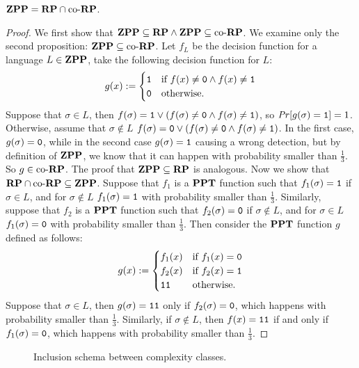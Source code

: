 \begin{theorem}
  \label{thm:zpprpcorp1}
  $\mathbf{ZPP} = \mathbf{RP} \cap \text{co-}\mathbf{RP}$.
\end{theorem}
\begin{proof}
  We first show that $\mathbf{ZPP} \subseteq \mathbf{RP} \land \mathbf{ZPP} \subseteq \text{co-}\mathbf{RP}$.
  We examine only the second proposition: $\mathbf{ZPP} \subseteq \text{co-}\mathbf{RP}$.
  Let $f_L$ be the decision function for a language $L \in \mathbf{ZPP}$,
  take the following decision function for $L$:
  $$
  g(x) := \begin{cases} \mathtt{1} & \text{if } f(x)\neq \mathtt{0} \land f(x)\neq \mathtt{1} \\ \mathtt{0} & \text{otherwise.}\end{cases}
  $$
  Suppose that $\sigma \in L$, then $f(\sigma)=\mathtt{1} \lor (f(\sigma)\neq \mathtt{0} \land f(\sigma)\neq \mathtt{1})$,
  so $\mathit{Pr}[g(\sigma)=\mathtt{1}]=1$. Otherwise, assume that $\sigma \not \in L$
  $f(\sigma)=\mathtt{0} \lor (f(\sigma)\neq \mathtt{0} \land f(\sigma)\neq \mathtt{1})$. In the first case,
  $g(\sigma)=\mathtt{0}$, while in the second case $g(\sigma)=\mathtt{1}$ causing a wrong detection,
  but by definition of $\mathbf{ZPP}$, we know that it can happen with probability smaller than
  $\frac 1 3$. So $g \in \text{co-}\mathbf{RP}$. The proof that $\mathbf{ZPP} \subseteq \mathbf{RP}$ is analogous.
  Now we show that $\mathbf{RP} \cap \text{co-}\mathbf{RP} \subseteq \mathbf{ZPP}$.
  Suppose that $f_1$ is a $\mathbf{PPT}$ function such that $f_1(\sigma)=\mathtt{1}$ if $\sigma \in L$,
  and for $\sigma \not \in L$ $f_1(\sigma)=\mathtt{1}$ with probability smaller than $\frac 1 3$.
  Similarly, suppose that $f_2$ is a $\mathbf{PPT}$ function such that $f_2(\sigma)=\mathtt{0}$ if $\sigma \not \in L$,
  and for $\sigma \in L$ $f_1(\sigma)=\mathtt{0}$ with probability smaller than $\frac 1 3$.
  Then consider the $\mathbf{PPT}$ function $g$ defined as follows:
  $$
  g(x):=\begin{cases} f_1(x) & \text{if }f_1(x)=\mathtt{0}\\
  f_2(x) & \text{if }f_2(x)=\mathtt{1}\\
  \mathtt{1}\mathtt{1} & \text{otherwise. }\end{cases}
  $$
  Suppose that $\sigma \in L$, then $g(\sigma)=\mathtt{1}\mathtt{1}$ only if $f_2(\sigma)=\mathtt{0}$,
  which happens with
  probability smaller than $\frac 1 3$. Similarly, if $\sigma \not \in L$, then
  $f(x)=\mathtt{1}\mathtt{1}$ if and only if $f_1(\sigma)=\mathtt{0}$, which happens with probability
  smaller than $\frac 1 3$.
\end{proof}

\begin{figure}[t]
  \centering
  \caption{Inclusion schema between complexity classes.}
  \label{fig:probcomp}
\end{figure}

